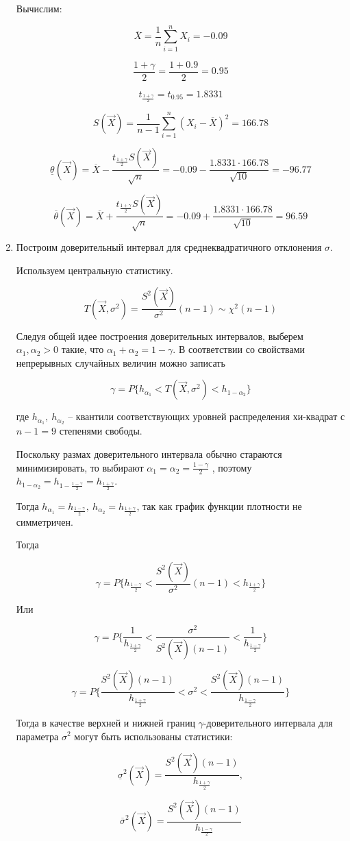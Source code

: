 \begin{enumerate}
Вычислим:

$$\overline X=\frac{1}{n}\sum_{i=1}^nX_i=-0.09$$

$$\frac{1+\gamma}{2}=\frac{1+0.9}{2}=0.95$$

$$t_{\frac{1+\gamma}{2}}=t_{0.95}=1.8331$$

\begin{equation*}
S(\vec X)=\frac{1}{n-1}\sum_{i=1}^n(X_i-\overline X)^2=166.78
\end{equation*}

$$\underline\theta(\vec X)=\overline X-\frac{t_{\frac{1+\gamma}{2}}S(\vec X)}{\sqrt{n}}=
-0.09 -\frac{1.8331\cdot 166.78}{\sqrt{10}}=-96.77$$

$$\overline\theta(\vec X)=\overline X+\frac{t_{\frac{1+\gamma}{2}}S(\vec X)}{\sqrt{n}}=
-0.09 +\frac{1.8331\cdot 166.78}{\sqrt{10}}=96.59$$

\item Построим доверительный интервал для среднеквадратичного отклонения $\sigma$. 

Используем центральную статистику. 

$$T(\vec X, \sigma^2)=\frac{S^2(\vec X)}{\sigma^2}(n-1) \sim \chi^2(n-1)$$


Следуя общей идее построения доверительных интервалов, выберем $\alpha_1,\alpha_2 > 0$ такие, что $\alpha_1+\alpha_2 = 1- \gamma$. В соответствии со свойствами непрерывных случайных величин можно записать

$$\gamma=P\{h_{\alpha_1}<T(\vec X, \sigma^2)<h_{1-\alpha_2}\}$$

где $h_{\alpha_1},~h_{\alpha_2}$ -- квантили соответствующих уровней распределения хи-квадрат с $n-1=9$ степенями свободы. 

Поскольку размах доверительного интервала обычно стараются минимизировать, то выбирают
$\alpha_1=\alpha_2=\frac{1-\gamma}{2}$ , поэтому $h_{1-\alpha_2}=h_{1-\frac{1-\gamma}{2}}=h_{\frac{1+\gamma}{2}}$. 

Тогда $h_{\alpha_1}=h_{\frac{1-\gamma}{2}},~h_{\alpha_2}=h_{\frac{1+\gamma}{2}}$, так как график функции плотности не симметричен. 

Тогда

$$\gamma=P\bigg\{h_{\frac{1-\gamma}{2}}<\frac{S^2(\vec X)}{\sigma^2}(n-1)<h_{\frac{1+\gamma}{2}}\bigg\}$$

Или

$$\gamma=P\bigg\{\frac{1}{h_{\frac{1+\gamma}{2}}}<\frac{\sigma^2}{S^2(\vec X)(n-1)}<\frac{1}{h_{\frac{1-\gamma}{2}}}\bigg\}$$

$$\gamma=P\bigg\{\frac{S^2(\vec X)(n-1)}{h_{\frac{1+\gamma}{2}}}<\sigma^2<\frac{S^2(\vec X)(n-1)}{h_{\frac{1-\gamma}{2}}}\bigg\}$$

Тогда в качестве верхней и нижней границ $\gamma$-доверительного интервала для параметра $\sigma^2$ могут быть использованы статистики:

$$\underline\sigma^2(\vec X)=\frac{S^2(\vec X)(n-1)}{h_{\frac{1+\gamma}{2}}},$$

$$\overline\sigma^2(\vec X)=\frac{S^2(\vec X)(n-1)}{h_{\frac{1-\gamma}{2}}}$$

\end{enumerate}

